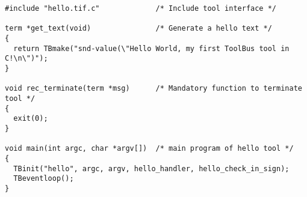 \begin{verbatim}
#include "hello.tif.c"             /* Include tool interface */

term *get_text(void)               /* Generate a hello text */
{
  return TBmake("snd-value(\"Hello World, my first ToolBus tool in C!\n\")");
}

void rec_terminate(term *msg)      /* Mandatory function to terminate tool */
{
  exit(0);
}

void main(int argc, char *argv[])  /* main program of hello tool */
{
  TBinit("hello", argc, argv, hello_handler, hello_check_in_sign);
  TBeventloop();
}
\end{verbatim}
